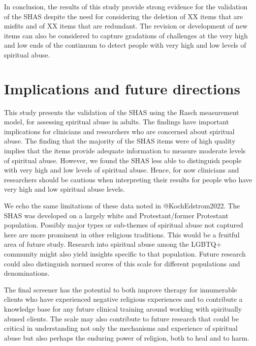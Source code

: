 \documentclass[
  letterpaper,
  DIV=11,
  numbers=noendperiod]{scrreport}
\begin{document}
In conclusion, the results of this study provide strong evidence for the
validation of the SHAS despite the need for considering the deletion of
XX items that are misfits and of XX items that are redundant. The
revision or development of new items can also be considered to capture
gradations of challenges at the very high and low ends of the continuum
to detect people with very high and low levels of spiritual abuse.

\hypertarget{implications-and-future-directions}{%
\section*{Implications and future
directions}\label{implications-and-future-directions}}

This study presents the validation of the SHAS using the Rasch
measurement model, for assessing spiritual abuse in adults. The findings
have important implications for clinicians and researchers who are
concerned about spiritual abuse. The finding that the majority of the
SHAS items were of high quality implies that the items provide adequate
information to measure moderate levels of spiritual abuse. However, we
found the SHAS less able to distinguish people with very high and low
levels of spiritual abuse. Hence, for now clinicians and researchers
should be cautious when interpreting their results for people who have
very high and low spiritual abuse levels.

We echo the same limitations of these data noted in @KochEdstrom2022.
The SHAS was developed on a largely white and Protestant/former
Protestant population. Possibly major types or sub-themes of spiritual
abuse not captured here are more prominent in other religious
traditions. This would be a fruitful area of future study. Research into
spiritual abuse among the LGBTQ+ community might also yield insights
specific to that population. Future research could also distinguish
normed scores of this scale for different populations and denominations.

The final screener has the potential to both improve therapy for
innumerable clients who have experienced negative religious experiences
and to contribute a knowledge base for any future clinical training
around working with spiritually abused clients. The scale may also
contribute to future research that could be critical in understanding
not only the mechanisms and experience of spiritual abuse but also
perhaps the enduring power of religion, both to heal and to harm.
\end{document}
